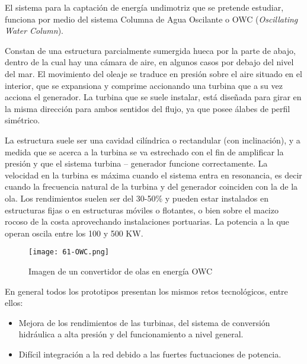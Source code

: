 El sistema para la captación de energía undimotriz que se pretende
estudiar, funciona por medio del sistema Columna de Agua Oscilante o OWC
(\emph{Oscillating Water Column}).

Constan de una estructura parcialmente sumergida hueca por la parte de
abajo, dentro de la cual hay una cámara de aire, en algunos casos por
debajo del nivel del mar. El movimiento del oleaje se traduce en presión
sobre el aire situado en el interior, que se expansiona y comprime
accionando una turbina que a su vez acciona el generador. La turbina que
se suele instalar, está diseñada para girar en la misma dirección para
ambos sentidos del flujo, ya que posee álabes de perfil simétrico.

La estructura suele ser una cavidad cilíndrica o rectandular (con
inclinación), y a medida que se acerca a la turbina se va estrechado con
el fin de amplificar la presión y que el sistema turbina -- generador
funcione correctamente. La velocidad en la turbina es máxima cuando el
sistema entra en resonancia, es decir cuando la frecuencia natural de la
turbina y del generador coinciden con la de la ola. Los rendimientos
suelen ser del 30-50\% y pueden estar instalados en estructuras fijas o
en estructuras móviles o flotantes, o bien sobre el macizo rocoso de la
costa aprovechando instalaciones portuarias. La potencia a la que operan
oscila entre los 100 y 500 KW.

\begin{figure}[hb]
\centering
\texttt{[image: 61-OWC.png]}
\caption{Imagen de un convertidor de olas en energía OWC}
\end{figure}

En general todos los prototipos presentan los mismos retos tecnológicos,
entre ellos:

\begin{itemize}
\item
  Mejora de los rendimientos de las turbinas, del sistema de conversión
  hidráulica a alta presión y del funcionamiento a nivel general.
\item
  Difícil integración a la red debido a las fuertes fuctuaciones de
  potencia.
\end{itemize}
